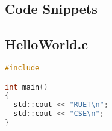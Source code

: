 \documentclass[document.tex]{subfiles}
\begin{document}
\begin{appendices}
        
        \chapter{Code Snippets}
        
        \section{HelloWorld.c}
        \begin{lstlisting}[language=c]
#include 

int main()
{
  std::cout << "RUET\n";
  std::cout << "CSE\n";
}
        \end{lstlisting}
\end{appendices}
\end{document}
